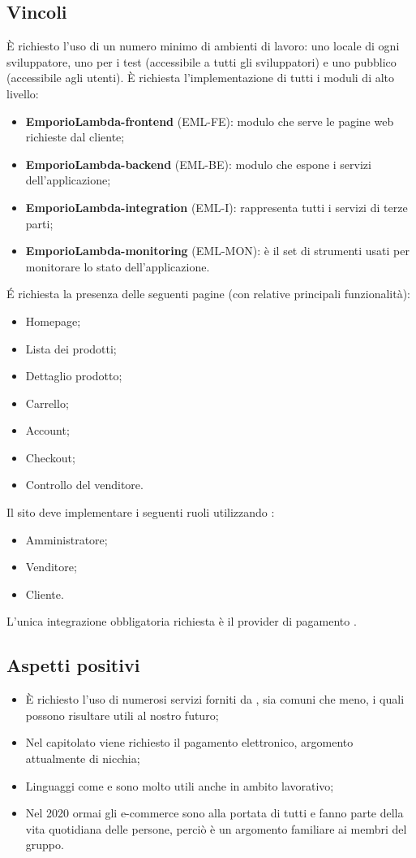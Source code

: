 \subsection{Vincoli}
È richiesto l'uso di un numero minimo di ambienti di lavoro: uno locale di ogni sviluppatore, uno per i test (accessibile a tutti gli sviluppatori) e uno pubblico (accessibile agli utenti).
È richiesta l'implementazione di tutti i moduli di alto livello:
\begin{itemize}
\item	\textbf{EmporioLambda-frontend} (EML-FE): modulo che serve le pagine web richieste dal cliente;
\item	\textbf{EmporioLambda-backend} (EML-BE): modulo che espone i servizi dell'applicazione;
\item	\textbf{EmporioLambda-integration} (EML-I): rappresenta tutti i servizi di terze parti;
\item	\textbf{EmporioLambda-monitoring} (EML-MON): è il set di strumenti usati per monitorare lo stato dell'applicazione.
\end{itemize}
\'E richiesta la presenza delle seguenti pagine (con relative principali funzionalità):
\begin{itemize}
\item	Homepage;
\item	Lista dei prodotti;
\item	Dettaglio prodotto;
\item	Carrello;
\item	Account;
\item	Checkout;
\item	Controllo del venditore.
\end{itemize}
Il sito deve implementare i seguenti ruoli utilizzando :
\begin{itemize}
\item	Amministratore;
\item	Venditore;
\item	Cliente.
\end{itemize}
L'unica integrazione obbligatoria richiesta è il provider di pagamento .
\subsection{Aspetti positivi}
\begin{itemize}
\item	È richiesto l'uso di numerosi servizi forniti da , sia comuni che meno, i quali possono risultare utili al nostro futuro;
\item	Nel capitolato viene richiesto il pagamento elettronico, argomento attualmente di nicchia;
\item	Linguaggi come  e  sono molto utili anche in ambito lavorativo;
\item	Nel 2020 ormai gli e-commerce sono alla portata di tutti e fanno parte della vita quotidiana delle persone, perciò è un argomento familiare ai membri del gruppo.
\end{itemize}
